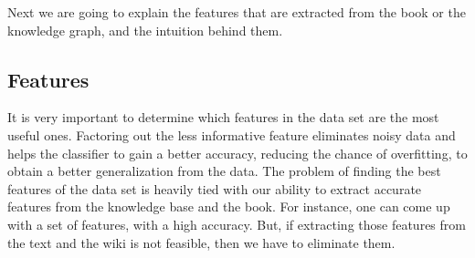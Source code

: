 \documentclass[letterpaper]{article}
\begin{document}
Next we are going to explain the features that are extracted from the book or the knowledge graph, and the intuition behind them.










\subsection{Features}
It is very important to determine which features in the data set are the most useful ones. Factoring out the less informative feature eliminates noisy data and helps the classifier to gain a better accuracy, reducing the chance of overfitting, to obtain a better generalization from the data. The problem of finding the best features of the data set is heavily tied with our ability to extract accurate features from the knowledge base and the book. For instance, one can come up with a set of features, with a high accuracy. But, if extracting those features from the text and the wiki is not feasible, then we have to eliminate them.
\end{document}
